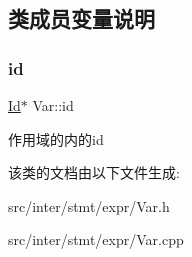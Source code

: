 \subsection{类成员变量说明}
\mbox{\label{class_var_a3e5c7c9425da4659290da5c0553c7dc6}} 
\subsubsection{\texorpdfstring{id}{id}}
{\footnotesize\ttfamily \hyperlink{class_id}{Id}$\ast$ Var\+::id}

作用域的内的id 

该类的文档由以下文件生成\+:\begin{DoxyCompactItemize}
\item 
src/inter/stmt/expr/Var.\+h\item 
src/inter/stmt/expr/Var.\+cpp\end{DoxyCompactItemize}
